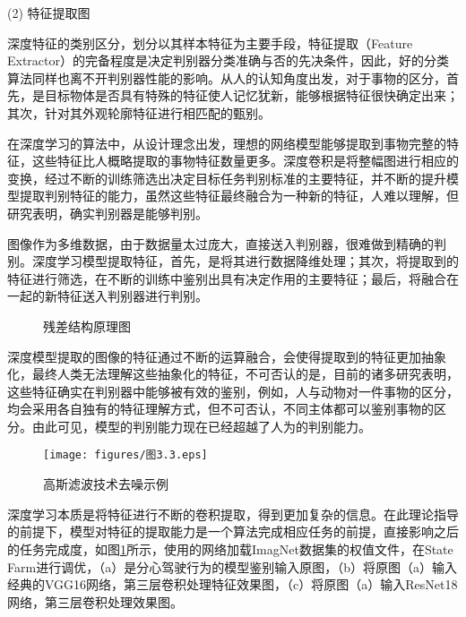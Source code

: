 (2)	特征提取图

深度特征的类别区分，划分以其样本特征为主要手段，特征提取（Feature Extractor）的完备程度是决定判别器分类准确与否的先决条件，因此，好的分类算法同样也离不开判别器性能的影响。从人的认知角度出发，对于事物的区分，首先，是目标物体是否具有特殊的特征使人记忆犹新，能够根据特征很快确定出来；其次，针对其外观轮廓特征进行相匹配的甄别。

在深度学习的算法中，从设计理念出发，理想的网络模型能够提取到事物完整的特征，这些特征比人概略提取的事物特征数量更多。深度卷积是将整幅图进行相应的变换，经过不断的训练筛选出决定目标任务判别标准的主要特征，并不断的提升模型提取判别特征的能力，虽然这些特征最终融合为一种新的特征，人难以理解，但研究表明，确实判别器是能够判别。

图像作为多维数据，由于数据量太过庞大，直接送入判别器，很难做到精确的判别。深度学习模型提取特征，首先，是将其进行数据降维处理；其次，将提取到的特征进行筛选，在不断的训练中鉴别出具有决定作用的主要特征；最后，将融合在一起的新特征送入判别器进行判别。

\begin{figure}[!ht]
	\centering
	\hfil
	\hfil
	\caption{残差结构原理图}
	\label{图3.2}
\end{figure}


深度模型提取的图像的特征通过不断的运算融合，会使得提取到的特征更加抽象化，最终人类无法理解这些抽象化的特征，不可否认的是，目前的诸多研究表明，这些特征确实在判别器中能够被有效的鉴别，例如，人与动物对一件事物的区分，均会采用各自独有的特征理解方式，但不可否认，不同主体都可以鉴别事物的区分。由此可见，模型的判别能力现在已经超越了人为的判别能力。

\begin{figure}[!ht]
	\centering
	\texttt{[image: figures/图3.3.eps]}
	\caption{高斯滤波技术去噪示例}\label{图3.3}
\end{figure}

深度学习本质是将特征进行不断的卷积提取，得到更加复杂的信息。在此理论指导的前提下，模型对特征的提取能力是一个算法完成相应任务的前提，直接影响之后的任务完成度，如图\ref{图3.2}所示，使用的网络加载ImagNet数据集的权值文件，在State Farm进行调优，（a）是分心驾驶行为的模型鉴别输入原图，（b）将原图（a）输入经典的VGG16网络，第三层卷积处理特征效果图，（c）将原图（a）输入ResNet18网络，第三层卷积处理效果图。

